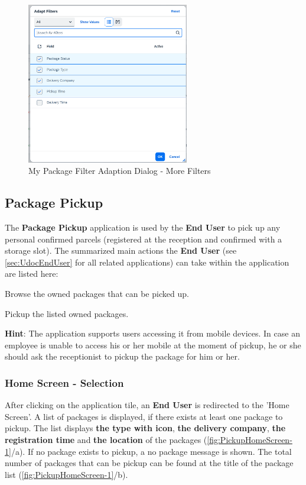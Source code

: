 \begin{figure}[H]
	\centering
	\includegraphics[height=200pt]{images/user_doc/myPack/MoreFIlterOption.png}
	\caption{My Package Filter Adaption Dialog - More Filters}
	\label{fig:mpMOreFilterAdaption}
\end{figure}
% 

\subsection{Package Pickup}
\label{subsec:pp}

The \textbf{Package Pickup} application is used by the \textbf{End User} to pick up any personal confirmed parcels (registered at the reception and confirmed with a storage slot). 
The summarized main actions the \textbf{End User} (see \autoref{sec:UdocEndUser} for all related applications) can take within the application are listed here:

\begin{compactenum}
	\item Browse the owned packages that can be picked up.
    \item Pickup the listed owned packages.
\end{compactenum}

\bigskip
\textbf{Hint}: The application supports users accessing it from mobile devices. In case an employee is unable to access his or her mobile at the moment of pickup, he or she should ask the receptionist to pickup the package for him or her.


\subsubsection{Home Screen - Selection}
After clicking on the application tile, an \textbf{End User} is redirected to the 'Home Screen'. A list of packages is displayed, if there exists at least one package to pickup. 
The list displays \textbf{the type with icon}, \textbf{the delivery company}, \textbf{the registration time} and \textbf{the location} of the packages (\autoref{fig:PickupHomeScreen-1}/a). 
If no package exists to pickup, a no package message is shown. 
The total number of packages that can be pickup can be found at the title of the package list (\autoref{fig:PickupHomeScreen-1}/b).

